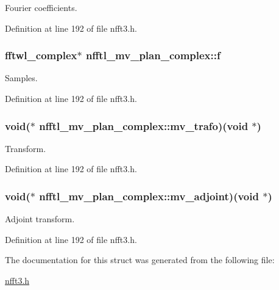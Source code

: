 Fourier coefficients. 



Definition at line 192 of file nfft3.\-h.

\hypertarget{structnfftl__mv__plan__complex_adb5c2e9ba052f02fec78e550413aacfa}{
\subsubsection[{f}]{\setlength{\rightskip}{0pt plus 5cm}fftwl\-\_\-complex$\ast$ nfftl\-\_\-mv\-\_\-plan\-\_\-complex\-::f}}\label{structnfftl__mv__plan__complex_adb5c2e9ba052f02fec78e550413aacfa}


Samples. 



Definition at line 192 of file nfft3.\-h.

\hypertarget{structnfftl__mv__plan__complex_a4d573c341aae7a4e034944772478658c}{
\subsubsection[{mv\-\_\-trafo}]{\setlength{\rightskip}{0pt plus 5cm}void($\ast$ nfftl\-\_\-mv\-\_\-plan\-\_\-complex\-::mv\-\_\-trafo)(void $\ast$)}}\label{structnfftl__mv__plan__complex_a4d573c341aae7a4e034944772478658c}


Transform. 



Definition at line 192 of file nfft3.\-h.

\hypertarget{structnfftl__mv__plan__complex_a5f31b4b9a03ac8f9a503c1ae42cad758}{
\subsubsection[{mv\-\_\-adjoint}]{\setlength{\rightskip}{0pt plus 5cm}void($\ast$ nfftl\-\_\-mv\-\_\-plan\-\_\-complex\-::mv\-\_\-adjoint)(void $\ast$)}}\label{structnfftl__mv__plan__complex_a5f31b4b9a03ac8f9a503c1ae42cad758}


Adjoint transform. 



Definition at line 192 of file nfft3.\-h.



The documentation for this struct was generated from the following file\-:\begin{DoxyCompactItemize}
\item 
\hyperlink{nfft3_8h}{nfft3.\-h}\end{DoxyCompactItemize}

